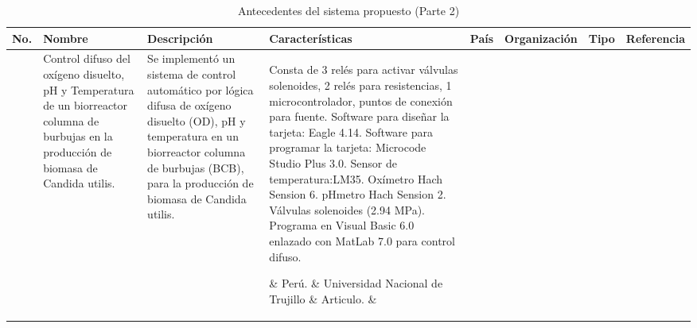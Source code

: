 \begin{sidewaystable}
  \scriptsize
  \centering
  \caption{Antecedentes del sistema propuesto (Parte 2)}
  \begin{tabular}{m{5mm} m{25mm} m{45mm} m{35mm} m{20mm} m{20mm} m{15mm} m{25mm}}
    \toprule
    \centering \textbf{No.} & \centering \textbf{Nombre} & \centering \textbf{Descripción} & \centering \textbf{Características} & \centering \textbf{País} & \centering \textbf{Organización} & \centering \textbf{Tipo} & \textbf{Referencia} \\ 
    \midrule
    \centering 4 & \centering Control difuso del oxígeno disuelto, pH y Temperatura de un biorreactor columna de burbujas en la producción de biomasa de Candida utilis. & \centering Se implementó un sistema de control automático por lógica difusa de oxígeno disuelto (OD), pH y temperatura en un biorreactor columna de burbujas (BCB), para la producción de biomasa de Candida utilis. & 
    \parbox{35mm}{Consta de 3 relés para activar válvulas solenoides, 2 relés para resistencias, 1 microcontrolador, puntos de conexión para fuente.
Software para diseñar la tarjeta: Eagle 4.14.
Software para programar la tarjeta: Microcode Studio Plus 3.0.
Sensor de temperatura:LM35.
Oxímetro Hach Sension 6.
pHmetro Hach Sension 2.
Válvulas solenoides (2.94 MPa).
Programa en Visual Basic 6.0 enlazado con MatLab 7.0 para control difuso.
} & 
    \centering Perú. & \centering Universidad Nacional de Trujillo & \centering Articulo. & \quad[=(] \\
    \midrule
     & \centering Modeling of automatic control system for air supply to a bioreactor using fuzzy control. & \centering Desarrollo de un sistema de control automático (ACS) eficaz del suministro de aire para la aireación en el biorreactor. & 
    \parbox{35mm}{Software utilizado: Fuzzy Logic Toolbox system of the Simulink MATLAB} & 
    \centering Rus & \centering Kuban state technological University & \centering Articulo. & \qquad[:v] \\
    \midrule
     & \centering Diseño de un sensor suave para estimar el Kla de un sistema de fermentación utilizando sistemas no lineales. & \centering Algoritmo matemático, propuesto para estimar la variable de Kla, basado en la observación del error entre la dinámica del error entre la dinámica de evolución del oxigeno disponible en línea y la dinámica de estimación de oxigeno estimado para el cultivo S.cerevisiae.& 
    \parbox{35mm}{Software empleado: Simulink-MATLAB
Sensor de tres etapas: Primera etapa diseño de simulación de biorreactor y red neuronal diferencial,
Segunda etapa, observador adaptable y tercera etapa neuro observador de estados. 
} & 
    \centering México & \centering IPN-UPIBI & \centering Tesis de maestría & \qquad[:v] \\
    \bottomrule
  \end{tabular}  
\end{sidewaystable}

